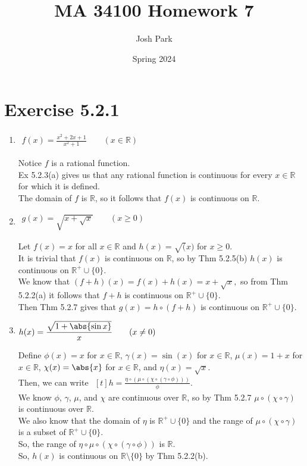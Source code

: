 \documentclass[11pt]{article}
\author{Josh Park}
\date{\vspace{-1em}Spring 2024\vspace{-1em}}
\title{MA 34100 Homework 7\vspace{-1em}}
\newcommand{\bbR}{\mathbb{R}}  %
\begin{document}
\maketitle
\section*{Exercise 5.2.1}
\begin{enumerate}[label=(\alph*)]
    \item $\begin{aligned} f(x)=\frac{x^2+2x+1}{x^2+1} \qquad (x\in\bbR)\end{aligned}$

    Notice $f$ is a rational function. \\
    Ex 5.2.3(a) gives us that any rational function is continuous for every $x\in\bbR$ for which it is defined. \\
    The domain of $f$ is $\bbR$, so it follows that $f(x)$ is continuous on $\bbR$.

    \item $\begin{aligned} g(x)=\sqrt{x+\sqrt{x}} \qquad (x\geq 0) \end{aligned}$

    Let $f(x)=x$ for all $x\in\bbR$ and $h(x)=\sqrt(x)$ for $x\geq 0$.\\
    It is trivial that $f(x)$ is continuous on $\bbR$, so by Thm 5.2.5(b) $h(x)$ is continuous on $\bbR^+\cup\{0\}$. \\
    We know that $(f+h)(x)=f(x)+h(x)=x+\sqrt{x},$ so from Thm 5.2.2(a) it follows that $f+h$ is continuous on $\bbR^+\cup\{0\}$. \\
    Then Thm 5.2.7 gives that $g(x)=h\circ(f+h)$ is continuous on $\bbR^+\cup\{0\}$. \\

    \item $\begin{aligned} h(x)=\frac{\sqrt{1+\abs{\sin x}}}{x} \qquad (x\neq 0)\end{aligned}$

    Define $\phi(x)=x$ for $x\in\bbR$, $\gamma(x)=\sin(x)$ for $x\in\bbR$, $\mu(x)=1+x$ for $x\in\bbR$, $\chi(x)=\abs{x}$ for $x\in\bbR$, and $\eta(x)=\sqrt{x}$. \\
    Then, we can write
    $\begin{aligned}[t] h=\frac{\eta\circ(\mu\circ(\chi\circ(\gamma\circ\phi)))}{\phi}. \end{aligned}$ \\
    We know $\phi$, $\gamma$, $\mu$, and $\chi$ are continuous over $\bbR$, so by Thm 5.2.7 $\mu\circ(\chi\circ\gamma)$ is continuous over $\bbR$. \\
    We also know that the domain of $\eta$ is $\bbR^+\cup\{0\}$ and the range of $\mu\circ(\chi\circ\gamma)$ is a subset of $\bbR^+\cup\{0\}$. \\
    So, the range of $\eta\circ\mu\circ(\chi\circ(\gamma\circ\phi))$ is $\bbR$. \\
    So, $h(x)$ is continuous on $\bbR\setminus \{0\}$ by Thm 5.2.2(b).


\end{enumerate}
\end{document}
